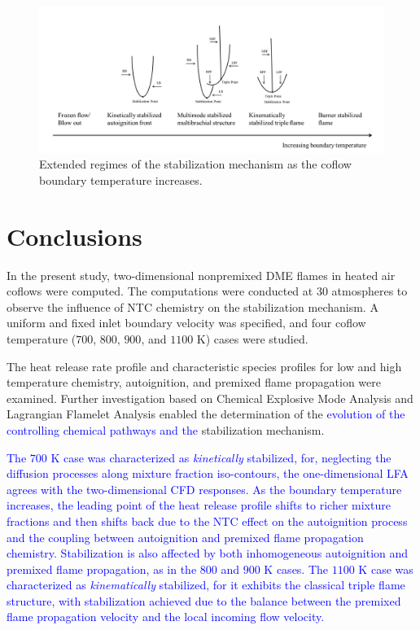 \documentclass[review,3p,times]{elsarticle}
\begin{document}
\begin{figure}[t]
  \centering
  \scriptsize
  \includegraphics[width=1.0\textwidth]{regime.png}
  \normalsize
  \caption{Extended regimes of the stabilization mechanism as the coflow boundary temperature increases.}
  \label{fig:regime}
\end{figure}


\section{Conclusions}

In the present study, two-dimensional nonpremixed DME flames in heated air coflows were computed.  The computations were conducted at $30$ atmospheres to observe the influence of NTC chemistry on the stabilization mechanism.  A uniform and fixed inlet boundary velocity was specified, and four coflow temperature ($700$, $800$, $900$, and $1100$ K) cases were studied.  

The heat release rate profile and characteristic species profiles for low and high temperature chemistry, autoignition, and premixed flame propagation were examined.  Further investigation based on Chemical Explosive Mode Analysis and Lagrangian Flamelet Analysis enabled the determination of the \textcolor{blue}{evolution of the controlling chemical pathways and the }stabilization mechanism.  

\textcolor{blue}{The $700$ K case was characterized as \emph {kinetically} stabilized, for, neglecting the diffusion processes along mixture fraction iso-contours, the one-dimensional LFA agrees with the two-dimensional CFD responses.  As the boundary temperature increases, the leading point of the heat release profile shifts to richer mixture fractions and then shifts back due to the NTC effect on the autoignition process and the coupling between autoignition and premixed flame propagation chemistry.  Stabilization is also affected by both inhomogeneous autoignition and premixed flame propagation, as in the $800$ and $900$ K cases.  The $1100$ K case was characterized as \emph {kinematically} stabilized, for it exhibits the classical triple flame structure, with stabilization achieved due to the balance between the premixed flame propagation velocity and the local incoming flow velocity.}
\end{document}
